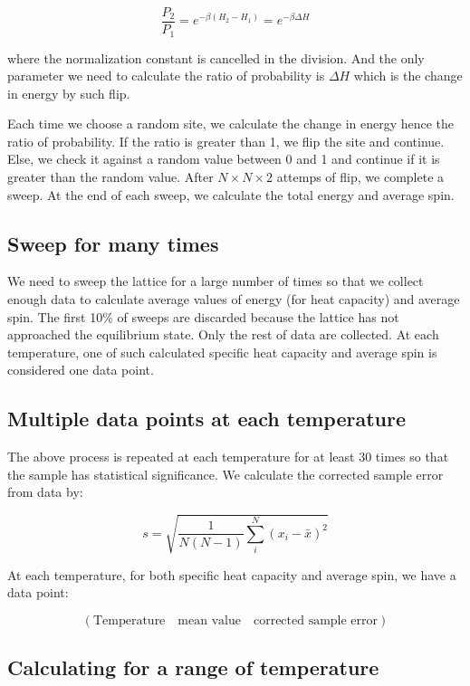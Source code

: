 \documentclass{article}
\begin{document}
$$\frac{P_2}{P_1} = e^{-\beta (H_2 - H_1)} = e^{-\beta \Delta H}$$

where the normalization constant is cancelled in the division. And
the only parameter we need to calculate the ratio of probability is
$\Delta H$ which is the change in energy by such flip.

Each time we choose a random site, we calculate the change in
energy hence the ratio of probability. If the ratio is greater than
1, we flip the site and continue. Else, we check it against a
random value between 0 and 1 and continue if it is greater than the
random value. After $N \times N \times 2$ attemps of flip, we
complete a sweep. At the end of each sweep, we calculate the total
energy and average spin.

\subsection{Sweep for many times}
\label{sec-2-3}

We need to sweep the lattice for a large number of times so that we
collect enough data to calculate average values of energy (for heat
capacity) and average spin. The first 10\% of sweeps are discarded
because the lattice has not approached the equilibrium state. Only
the rest of data are collected. At each temperature, one of such
calculated specific heat capacity and average spin is considered
one data point.

\subsection{Multiple data points at each temperature}
\label{sec-2-4}

The above process is repeated at each temperature for at least 30
times so that the sample has statistical significance. We calculate
the corrected sample error from data by:

$$s = \sqrt{\frac{1}{N(N -1) } \sum_i^N (x_i - \bar{x})^2}$$

At each temperature, for both specific heat capacity and average
spin, we have a data point:

$$(\text{Temperature}\quad \text{mean value} \quad \text{corrected sample error})$$

\subsection{Calculating for a range of temperature}
\label{sec-2-5}
\end{document}
